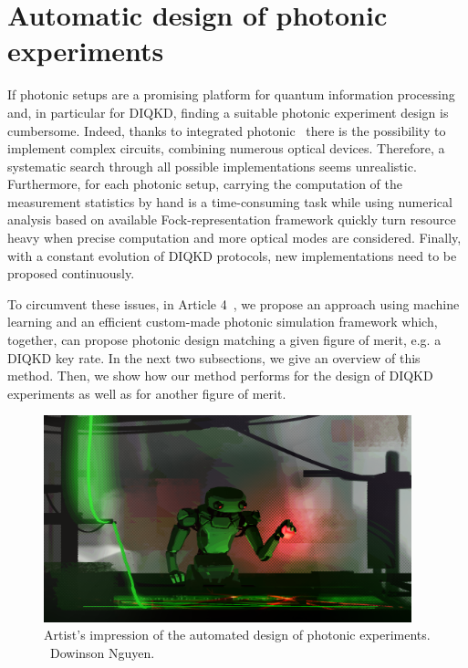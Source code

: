 %

\section{Automatic design of photonic experiments}

If photonic setups are a promising platform for quantum information processing and, in particular for DIQKD, finding a suitable photonic experiment design is cumbersome.
Indeed, thanks to integrated photonic~\cite{Pelucchi2021} there is the possibility to implement complex circuits, combining numerous optical devices.
Therefore, a systematic search through all possible implementations seems unrealistic.
Furthermore, for each photonic setup, carrying the computation of the measurement statistics by hand is a time-consuming task while using numerical analysis based on available Fock-representation framework quickly turn resource heavy when precise computation and more optical modes are considered.
Finally, with a constant evolution of DIQKD protocols, new implementations need to be proposed continuously.

To circumvent these issues, in Article 4~\cite{Valcarce2022b}, we propose an approach using machine learning and an efficient custom-made photonic simulation framework which, together, can propose photonic design matching a given figure of merit, e.g. a DIQKD key rate. 
In the next two subsections, we give an overview of this method.
Then, we show how our method performs for the design of DIQKD experiments as well as for another figure of merit.

\begin{figure}
	\begin{center}
		\includegraphics[width=0.95\textwidth]{chapters/deviceindependent/img/illustration_automated_design.png}
	\end{center}
	\caption{Artist's impression of the automated design of photonic experiments. \textcopyright\, Dowinson Nguyen.}
	\label{fig:}
\end{figure}



